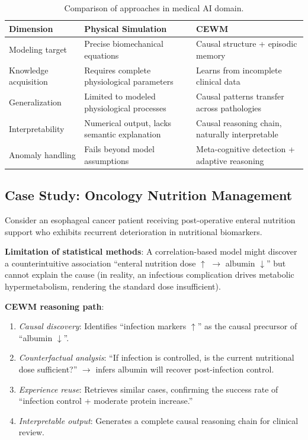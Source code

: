\documentclass[11pt,a4paper]{article}
\newcommand{\CEWM}{\textsc{CEWM}}
\begin{document}
\begin{table}[H]
\centering
\caption{Comparison of approaches in medical AI domain.}\label{tab:medical-compare}
\small
\begin{tabularx}{\textwidth}{lXX}
\toprule
\textbf{Dimension} & \textbf{Physical Simulation} & \textbf{\CEWM{}} \\
\midrule
Modeling target & Precise biomechanical equations & Causal structure + episodic memory \\
Knowledge acquisition & Requires complete physiological parameters & Learns from incomplete clinical data \\
Generalization & Limited to modeled physiological processes & Causal patterns transfer across pathologies \\
Interpretability & Numerical output, lacks semantic explanation & Causal reasoning chain, naturally interpretable \\
Anomaly handling & Fails beyond model assumptions & Meta-cognitive detection + adaptive reasoning \\
\bottomrule
\end{tabularx}
\end{table}

\subsection{Case Study: Oncology Nutrition Management}

Consider an esophageal cancer patient receiving post-operative enteral nutrition support who exhibits recurrent deterioration in nutritional biomarkers.

\textbf{Limitation of statistical methods}: A correlation-based model might discover a counterintuitive association ``enteral nutrition dose $\uparrow$ $\to$ albumin $\downarrow$'' but cannot explain the cause (in reality, an infectious complication drives metabolic hypermetabolism, rendering the standard dose insufficient).

\textbf{\CEWM{} reasoning path}:
\begin{enumerate}[nosep]
  \item \emph{Causal discovery}: Identifies ``infection markers $\uparrow$'' as the causal precursor of ``albumin $\downarrow$''.
  \item \emph{Counterfactual analysis}: ``If infection is controlled, is the current nutritional dose sufficient?'' $\to$ infers albumin will recover post-infection control.
  \item \emph{Experience reuse}: Retrieves similar cases, confirming the success rate of ``infection control + moderate protein increase.''
  \item \emph{Interpretable output}: Generates a complete causal reasoning chain for clinical review.
\end{enumerate}
\end{document}
